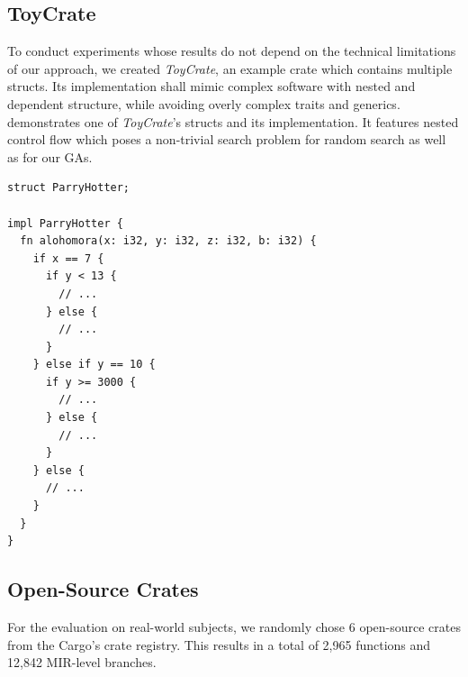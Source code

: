 \documentclass[paper=a4,%
  twoside,%
  BCOR4mm,%
  abstract=true,%
  toc=bibliography,%
  chapterprefix=true,%
  toc=bibliographynumbered,%
  open=right,%
  english,%
  pagesize=pdftex]{scrreprt}
\newcommand{\benchnum}{6\xspace}
\newcommand{\mir}{\ac{MIR}\xspace}
\newcommand{\toycrate}{\emph{ToyCrate}\xspace}
\begin{document}
\subsection*{ToyCrate}
To conduct experiments whose results do not depend on the technical limitations of our approach, we created \toycrate, an example crate which contains multiple structs. Its implementation shall mimic complex software with nested and dependent structure, while avoiding overly complex traits and generics.  demonstrates one of \toycrate's structs and its implementation. It features nested control flow which poses a non-trivial search problem for random search as well as for our \acp{GA}.

\begin{lstlisting}[style=boxed, caption={One of the structs that \toycrate provides}, label=lst:toycrate]
struct ParryHotter;

impl ParryHotter {
  fn alohomora(x: i32, y: i32, z: i32, b: i32) {
    if x == 7 {
      if y < 13 {
        // ...
      } else {
        // ...
      }
    } else if y == 10 {
      if y >= 3000 {
        // ...
      } else {
        // ...
      }
    } else {
      // ...
    }
  }
}
\end{lstlisting}

\subsection*{Open-Source Crates}
For the evaluation on real-world subjects, we randomly chose \benchnum open-source crates from the Cargo's crate registry. This results in a total of 2,965 functions and 12,842 \mir-level branches.
\end{document}

